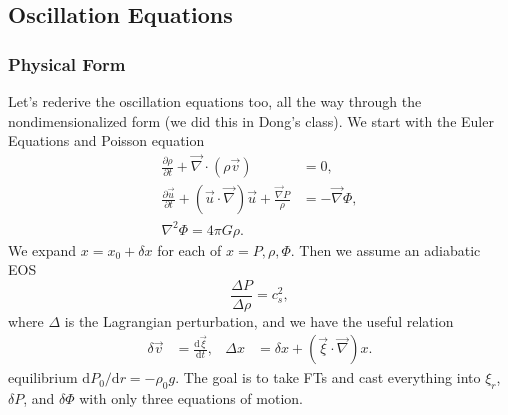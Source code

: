 \documentclass[11pt,
        usenames, %
        twocolumn,
        landscape,
        dvipsnames %
    ]{article}
\newcommand*{\rd}[2]{\frac{\mathrm{d}#1}{\mathrm{d}#2}}
\newcommand*{\pd}[2]{\frac{\partial#1}{\partial#2}}
\newcommand*{\rdil}[2]{\mathrm{d}#1 / \mathrm{d}#2}
\newcommand*{\p}[1]{\left(#1\right)}
\begin{document}
\subsection{Oscillation Equations}

\subsubsection{Physical Form}

Let's rederive the oscillation equations too, all the way through the
nondimensionalized form (we did this in Dong's class). We start with the Euler
Equations and Poisson equation
\begin{align}
    \pd{\rho}{t} + \vec{\nabla} \cdot \p{\rho \vec{v}} &= 0,\\
    \pd{\vec{u}}{t} + \p{\vec{u} \cdot \vec{\nabla}}\vec{u}
        + \frac{\vec{\nabla}P}{\rho} &= -\vec{\nabla} \Phi,\\
    \nabla^2 \Phi = 4\pi G\rho.
\end{align}
We expand $x = x_0 + \delta x$ for each of $x = P, \rho, \Phi$. Then we assume
an adiabatic EOS
\begin{equation}
    \frac{\Delta P}{\Delta \rho} = c_s^2,
\end{equation}
where $\Delta$ is the Lagrangian perturbation, and we have the useful relation
\begin{align}
    \delta \vec{v} &= \rd{\vec{\xi}}{t}, &
    \Delta x &= \delta x + \p{\vec{\xi} \cdot \vec{\nabla}}x.
\end{align}
equilibrium $\rdil{P_0}{r} = -\rho_0 g$. The goal is to take FTs and cast
everything into $\xi_r$, $\delta P$, and $\delta \Phi$ with only three equations
of motion.
\end{document}
